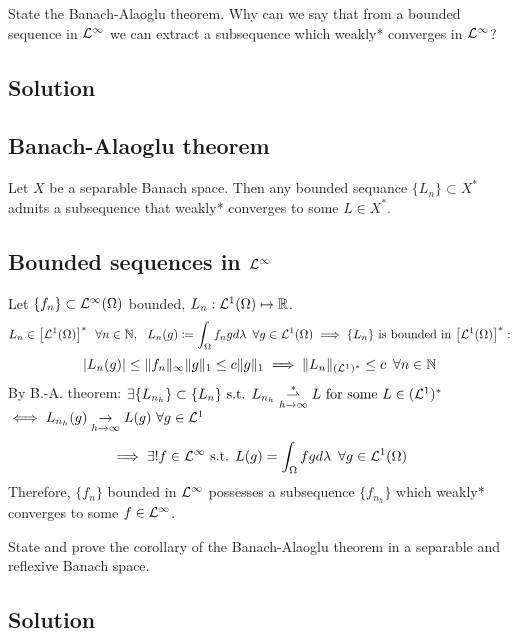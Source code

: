 
\question
State the Banach-Alaoglu theorem. Why can we say that from a bounded sequence in $\mathcal{L}^{\infty}$ we can extract a subsequence which weakly* converges in $\mathcal{L}^{\infty}$?

\subsection*{Solution}

\subsection{Banach-Alaoglu theorem}
Let $X$ be a separable Banach space. Then any bounded sequance $\{L_n\} \subset X^*$ admits a subsequence that weakly* converges to some $L \in X^*$.

\subsection{Bounded sequences in \texorpdfstring{$\mathcal{L}^{\infty}$}{Linf}}
Let $\{f_n\} \subset \mathcal{L}^{\infty}(\Omega)$ bounded, $L_n: \mathcal{L}^1(\Omega)\mapsto \mathbb{R}$.\\
\[
L_n \in \big[\mathcal{L}^1(\Omega)\big]^* \,\,\,\,\forall n\in \mathbb{N}, \,\,\,\,L_n(g)\coloneqq \displaystyle\int_{\Omega}f_ng d\lambda\,\,\,\forall g \in \mathcal{L}^1(\Omega) \implies \{L_n\}\mbox{ is bounded in } \big[\mathcal{L}^1(\Omega)\big]^*:
\]
\[\lvert L_n(g)\rvert \le \|f_n\|_{\infty} \|g\|_1 \le c\|g\|_1 \implies \|L_n\|_{(\mathcal{L}^1)^*}\le c\,\,\,\forall n\in \mathbb{N}\\
\]
By B.-A. theorem:
$\exists \{L_{n_h}\}\subset \{L_n\}\mbox{ s.t. }L_{n_h}\underset{h\to\infty}{\overset{\ast}{\rightharpoonup}}  L \mbox{ for some } L\in (\mathcal{L}^1)^* $
$\iff L_{n_h}(g)\underset{h\to\infty}{\to} L(g)\,\, \forall g \in \mathcal{L}^1 $
\[
 \implies \exists ! f \in \mathcal{L}^{\infty} \mbox{ s.t. } L(g) = \displaystyle\int_{\Omega}fg d\lambda\,\,\,\forall g \in \mathcal{L}^1(\Omega)
\]
Therefore, $\{f_n\}$ bounded in $\mathcal{L}^{\infty}$ possesses a subsequence $\{f_{n_h}\}$ which weakly* converges to some $f\in\mathcal{L}^{\infty} $.


\question
State and prove the corollary of the Banach-Alaoglu theorem in a separable and reflexive Banach space.

\subsection*{Solution}

